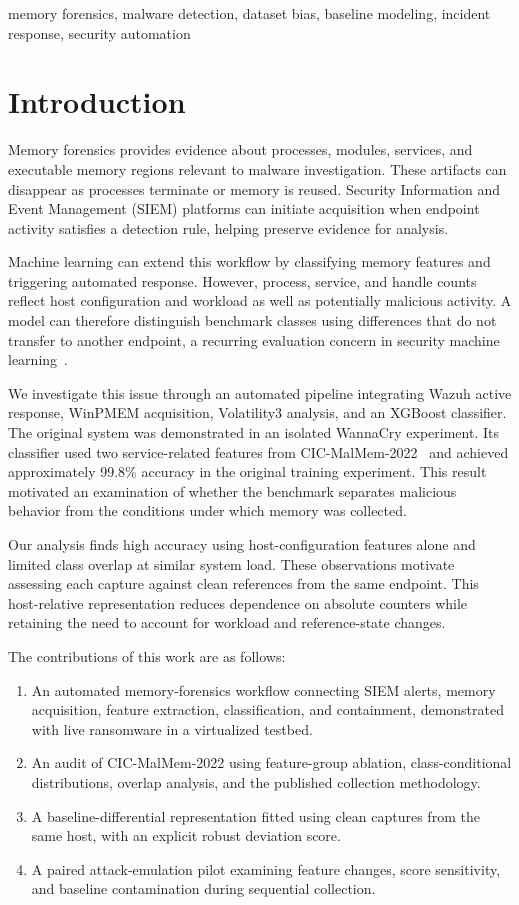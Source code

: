 \documentclass[conference]{IEEEtran}
\begin{document}
\begin{IEEEkeywords}
memory forensics, malware detection, dataset bias, baseline modeling,
incident response, security automation
\end{IEEEkeywords}

\section{Introduction}

Memory forensics provides evidence about processes, modules, services, and
executable memory regions relevant to malware investigation. These artifacts
can disappear as processes terminate or memory is reused. Security Information
and Event Management (SIEM) platforms can initiate acquisition when endpoint
activity satisfies a detection rule, helping preserve evidence for analysis.

Machine learning can extend this workflow by classifying memory features and
triggering automated response. However, process, service, and handle counts
reflect host configuration and workload as well as potentially malicious
activity. A model can therefore distinguish benchmark classes using differences
that do not transfer to another endpoint, a recurring evaluation concern in
security machine learning~\cite{arp2022}.

We investigate this issue through an automated pipeline integrating Wazuh active
response, WinPMEM acquisition, Volatility3 analysis, and an XGBoost classifier.
The original system was demonstrated in an isolated WannaCry experiment. Its
classifier used two service-related features from CIC-MalMem-2022~\cite{carrier2022}
and achieved approximately 99.8\% accuracy in the original training experiment.
This result motivated an examination of whether the benchmark separates
malicious behavior from the conditions under which memory was collected.

Our analysis finds high accuracy using host-configuration features alone and
limited class overlap at similar system load. These observations motivate
assessing each capture against clean references from the same endpoint. This
host-relative representation reduces dependence on absolute counters while
retaining the need to account for workload and reference-state changes.

The contributions of this work are as follows:
\begin{enumerate}
\item An automated memory-forensics workflow connecting SIEM alerts, memory
acquisition, feature extraction, classification, and containment, demonstrated
with live ransomware in a virtualized testbed.
\item An audit of CIC-MalMem-2022 using feature-group ablation, class-conditional
distributions, overlap analysis, and the published collection methodology.
\item A baseline-differential representation fitted using clean captures from
the same host, with an explicit robust deviation score.
\item A paired attack-emulation pilot examining feature changes, score
sensitivity, and baseline contamination during sequential collection.
\end{enumerate}
\end{document}
